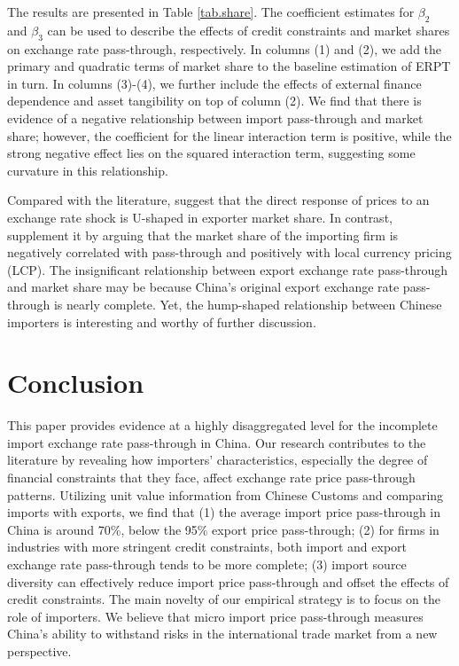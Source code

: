\documentclass[12pt]{article}
\begin{document}
The results are presented in Table \ref{tab.share}. The coefficient estimates for $\beta_2$ and $\beta_3$ can be used to describe the effects of credit constraints and market shares on exchange rate pass-through, respectively. In columns (1) and (2), we add the primary and quadratic terms of market share to the baseline estimation of ERPT in turn. In columns (3)-(4), we further include the effects of external finance dependence and asset tangibility on top of column (2). We find that there is evidence of a negative relationship between import pass-through and market share; however, the coefficient for the linear interaction term is positive, while the strong negative effect lies on the squared interaction term, suggesting some curvature in this relationship.

Compared with the literature, \cite{auer2016} suggest that the direct response of prices to an exchange rate shock is U-shaped in exporter market share. In contrast, \cite{devereux2017} supplement it by arguing that the market share of the importing firm is negatively correlated with pass-through and positively with local currency pricing (LCP). The insignificant relationship between export exchange rate pass-through and market share may be because China's original export exchange rate pass-through is nearly complete. Yet, the hump-shaped relationship between Chinese importers is interesting and worthy of further discussion.

\section{Conclusion}\label{Conclusion}

This paper provides evidence at a highly disaggregated level for the incomplete import exchange rate pass-through in China. Our research contributes to the literature by revealing how importers' characteristics, especially the degree of financial constraints that they face, affect exchange rate price pass-through patterns. Utilizing unit value information from Chinese Customs and comparing imports with exports, we find that (1) the average import price pass-through in China is around 70\%, below the 95\% export price pass-through; (2) for firms in industries with more stringent credit constraints, both import and export exchange rate pass-through tends to be more complete; (3) import source diversity can effectively reduce import price pass-through and offset the effects of credit constraints. The main novelty of our empirical strategy is to focus on the role of importers. We believe that micro import price pass-through measures China's ability to withstand risks in the international trade market from a new perspective.
\end{document}
